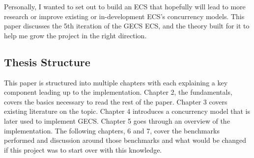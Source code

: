 Personally, I wanted to set out to build an ECS that hopefully will lead to more research or improve existing or in-development ECS's concurrency models. This paper discusses the 5th iteration of the GECS ECS, and the theory built for it to help me grow the project in the right direction.

\subsection{Thesis Structure}
This paper is structured into multiple chapters with each explaining a key component leading up to the implementation. Chapter 2, the fundamentals, covers the basics necessary to read the rest of the paper. Chapter 3 covers existing literature on the topic. Chapter 4 introduces a concurrency model that is later used to implement GECS. Chapter 5 goes through an overview of the implementation. The following chapters, 6 and 7, cover the benchmarks performed and discussion around those benchmarks and what would be changed if this project was to start over with this knowledge.

\newpage